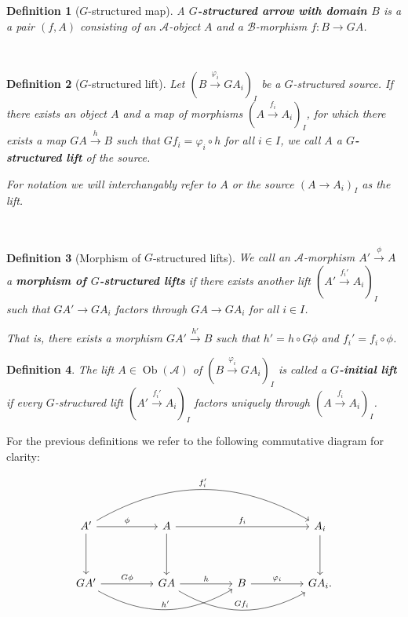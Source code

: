 \documentclass[12pt,a4paper]{article}
\newtheorem{definition}{Definition}[section] %
\DeclareMathOperator{\Ob}{Ob}
\begin{document}
\begin{definition}[$G$-structured map]
		A \textbf{$G$-structured arrow with domain $B$} is a a pair $(f, A)$ consisting of an $\mathcal{A}$-object $A$ and a $\mathcal{B}$-morphism $f: B \to GA$. 
\end{definition}
\
\begin{definition}[$G$-structured lift]
	Let $(B \stackrel{\varphi_i}{\to} GA_i)_I$ be a $G$-structured source. If there exists an object $A$ and a map of morphisms  $(A \stackrel{f_i}{\to} A_i)_I$, for which there exists a map $GA \stackrel{h}{\to} B$ such that $Gf_i = \varphi_i \circ h$ for all $i \in I$, we call $A$ a \textbf{$G$-structured lift} of the source. 
	
	For notation we will interchangably refer to $A$ or the source $(A \to A_i)_I$ as the lift.
\end{definition}
\
\begin{definition}[Morphism of $G$-structured lifts]
	We call an  $\mathcal{A}$-morphism $A' \stackrel{\phi}{\to} A$ a \textbf{morphism of $G$-structured lifts} if there exists another lift $(A' \stackrel{f_i'}{\to} A_i)_I$ such that $GA' \to GA_i$ factors  through $GA \to GA_i$ for all $i \in I$. 
	
	That is, there exists a  morphism $GA' \stackrel{h'}{\to} B$ such that $h' = h \circ G\phi$ and $f_i' = f_i \circ \phi$. 
	
	
	\end{definition}
\begin{definition}
	The lift $A \in \Ob(\mathcal{A})$ of $(B \stackrel{\varphi_i}{\to} GA_i)_I$ is called a \textbf{$G$-initial lift} if  every $G$-structured lift $(A' \stackrel{f_i'}{\to} A_i)_I$ factors uniquely through $(A \stackrel{f_i}{\to} A_i)_I$.
\end{definition}
	
For the previous definitions we refer to the following commutative diagram for clarity:

\[\begin{tikzcd}
	{A'} && A && {} && {A_i} \\
	\\
	{GA'} && GA && B && {GA_i}
	\arrow["\phi", from=1-1, to=1-3]
	\arrow["{f_i'}", bend left, from=1-1, to=1-7]
	\arrow[from=1-1, to=3-1]
	\arrow["{f_i}", from=1-3, to=1-7]
	\arrow[from=1-3, to=3-3]
	\arrow[from=1-7, to=3-7]
	\arrow["{G\phi}", from=3-1, to=3-3]
	\arrow["{h'}", bend right, from=3-1, to=3-5]
	\arrow["h", from=3-3, to=3-5]
	\arrow["{Gf_i}", bend right, from=3-3, to=3-7]
	\arrow["{\varphi_i}", from=3-5, to=3-7].
\end{tikzcd}\]
\end{document}
